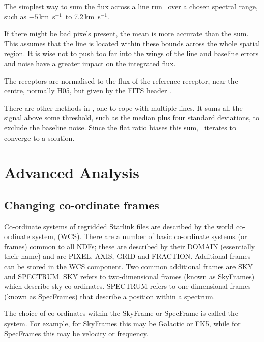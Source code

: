 \documentclass[11pt,oneside,chapters]{starlink}
\newcommand{\kms}{\mbox{$\,$km~s$^{-1}$}}   %
\newcommand{\kms}{\,km~s$^{-1}$}   %
\begin{document}
\begin{terminalv}
\end{terminalv}

The simplest way to sum the flux across a line run \stats\ over a chosen
spectral range, such as $-5$\kms\ to 7.2\kms.

\begin{terminalv}
\end{terminalv}

If there might be bad pixels present, the mean is more accurate than the sum.
This assumes that the line is located within these bounds across the whole
spatial region.  It is wise not to push too far into the wings of the line and
baseline errors and noise have a greater impact on the integrated flux.

The receptors are normalised to the flux of the reference receptor,
near the centre, normally H05, but given by the FITS header .


There are other methods in \ORACDR, one to cope with multiple lines.
It sums all the signal above some threshold, such as the median plus four
standard deviations, to exclude the baseline noise.  Since the flat
ratio biases this sum, \ORACDR\ iterates to converge to a solution.

\clearpage
\chapter{Advanced Analysis}
\label{sec:advanced}

\section{Changing co-ordinate frames}

Co-ordinate systems of regridded Starlink files are described by the
world co-ordinate system, (WCS). There are a number of basic co-ordinate
systems (or frames) common to all NDFs; these are described by their
DOMAIN (essentially their name) and are PIXEL, AXIS, GRID and
FRACTION. Additional frames can be stored in the WCS component. Two
common additional frames are SKY and SPECTRUM. SKY refers to
two-dimensional frames (known as SkyFrames) which describe sky
co-ordinates. SPECTRUM refers to one-dimensional frames (known as
SpecFrames) that describe a position within a spectrum.

The choice of co-ordinates within the SkyFrame or SpecFrame is called
the system. For example, for SkyFrames this may be Galactic or FK5,
while for SpecFrames this may be velocity or frequency.
\end{document}
